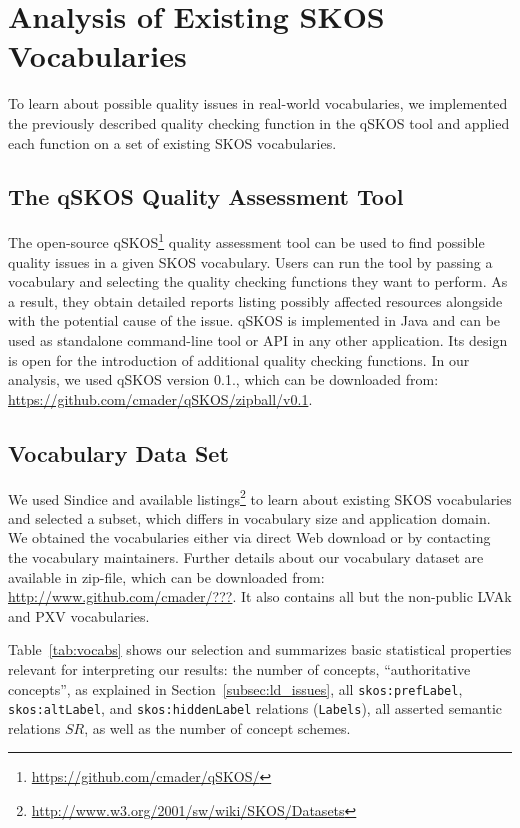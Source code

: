 
\section{Analysis of Existing SKOS Vocabularies}\label{sec:analysis}

To learn about possible quality issues in real-world vocabularies, we implemented the previously described quality checking function in the qSKOS tool and applied each function on a set of existing SKOS vocabularies.

\subsection{The qSKOS Quality Assessment Tool}

The open-source qSKOS\footnote{\url{https://github.com/cmader/qSKOS/}} quality assessment tool can be used to find possible quality issues in a given SKOS vocabulary. Users can run the tool by passing a vocabulary and selecting the quality checking functions they want to perform. As a result, they obtain detailed reports listing possibly affected resources alongside with the potential cause of the issue. qSKOS is implemented in Java and can be used as standalone command-line tool or API in any other application. Its design is open for the introduction of additional quality checking functions. In our analysis, we used qSKOS version 0.1., which can be downloaded from: \url{https://github.com/cmader/qSKOS/zipball/v0.1}.

\subsection{Vocabulary Data Set}

We used Sindice and available listings\footnote{\url{http://www.w3.org/2001/sw/wiki/SKOS/Datasets}} to learn about existing SKOS vocabularies and selected a subset, which differs in vocabulary size and application domain. We obtained the vocabularies either via direct Web download or by contacting the vocabulary maintainers. Further details about our vocabulary dataset are available in zip-file, which can be downloaded from: \url{http://www.github.com/cmader/???}. It also contains all but the non-public LVAk and PXV vocabularies.

Table~\ref{tab:vocabs} shows our selection and summarizes basic statistical properties relevant for interpreting our results: the number of concepts, ``authoritative concepts'', as explained in Section~\ref{subsec:ld_issues}, all \texttt{skos:prefLabel}, \texttt{skos:altLabel}, and \texttt{skos:hiddenLabel} relations (\texttt{Labels}), all asserted semantic relations $SR$, as well as the number of concept schemes.



